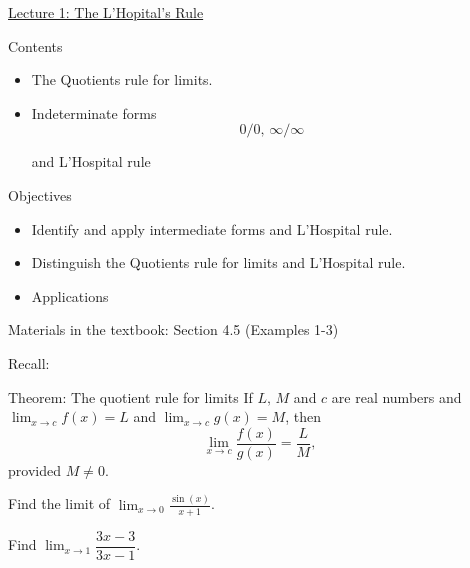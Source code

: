 
\begin{frame}
\begin{center}
\underline{Lecture 1: The L'Hopital's Rule}
\end{center}
Contents
\begin{itemize}
	\item   The Quotients rule for limits.
	\item  Indeterminate forms \[ 0/0,\, \infty/ \infty \]

	and L'Hospital rule
\end{itemize}



Objectives
\begin{itemize}
	\item  Identify and apply intermediate forms and L'Hospital rule.
	\item Distinguish the Quotients rule for limits and L'Hospital rule.
	\item Applications
\end{itemize}


Materials in the textbook:  Section 4.5 (Examples 1-3)
\end{frame}

\begin{frame}
Recall:

\begin{mybox}{Theorem: The quotient rule for limits}{}
	If $L,\,M$ and $c$  are real numbers and $\lim_{x \rightarrow c} f(x)=L$ and $\lim_{x \rightarrow c} g(x)=M$, then
	\begin{equation*}
		\lim_{x \rightarrow c} \dfrac{f(x)}{g(x)}=\dfrac{L}{M},
	\end{equation*}
	provided $M \neq 0.$

\end{mybox}

\begin{myexample}{}{}
Find the limit of   $\displaystyle \lim_{x \to 0} \frac{\sin(x)}{x+1}$.

\end{myexample}



\end{frame}


\begin{frame}

\begin{myexample}{}{}
	Find $\lim_{x \rightarrow 1} \dfrac{3x-3}{3x-1}.$
\end{myexample}


\end{frame}


